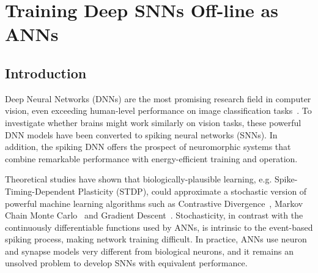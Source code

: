 \chapter{Training Deep SNNs Off-line as ANNs}
\label{cha:Conv}
\section{Introduction}
Deep Neural Networks (DNNs) are the most promising research field in computer vision, even exceeding human-level performance on image classification tasks~\cite{he2015delving}.
	To investigate whether brains might work similarly on vision tasks, these powerful DNN models have been converted to spiking neural networks (SNNs).
	In addition, the spiking DNN offers the prospect of neuromorphic systems that combine remarkable performance with energy-efficient training and operation.
	
	Theoretical studies have shown that biologically-plausible learning, e.g. Spike-Timing-Dependent Plasticity (STDP), could approximate a stochastic version of powerful machine learning algorithms
	such as 
	Contrastive Divergence~\cite{neftci2013event}, Markov Chain Monte Carlo~\cite{buesing2011neural} and Gradient Descent~\cite{o2016deep}.
	Stochasticity, in contrast with the continuously differentiable functions used by ANNs, is intrinsic to the event-based spiking process, making network training difficult.
	In practice, ANNs use neuron and synapse models very different from biological neurons, and it remains an unsolved problem to develop SNNs with equivalent performance.
	
	
